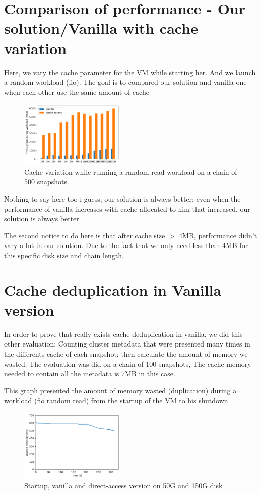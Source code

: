 \documentclass[sigplan,screen,10pt]{acmart}
\begin{document}
	\section*{Comparison of performance - Our solution/Vanilla with cache variation}
	
	Here, we vary the cache parameter for the VM while starting her. And we launch a random workload (fio).
	The goal is to compared our solution and vanilla one when each other use the same amount of cache 
	
	\begin{figure}[h]
		\center
		\includegraphics[width=0.45\textwidth]{cache_variation.pdf}
		\caption{Cache variation while running a random read workload on a chain of 500 snapshots}
		\label{fig:fig-c}
	\end{figure}

	Nothing to say here too i guess, our solution is always better; even when the performance of vanilla increases with cache allocated to him that increased, our solution is always better.
	
	The second notice to do here is that after cache size $>$ 4MB, performance didn't vary a lot in our solution. Due to the fact that we only need less than 4MB for this specific disk size and chain length.
	
	\section*{Cache deduplication in Vanilla version}
	
	In order to prove that really exists cache deduplication in vanilla, we did this other evaluation: Counting cluster metadata that were presented many times in the differents cache of each snapshot; then calculate the amount of memory we wasted. The evaluation was did on a chain of 100 snapshots, The cache memory needed to contain all the metadata is 7MB in this case.
	
	This graph presented the amount of memory wasted (duplication) during a workload (fio random read) from the startup of the VM to his shutdown.
	
	\begin{figure}[h]
		\center
		\includegraphics[width=0.45\textwidth]{dupli_memory.pdf}
		\caption{Startup, vanilla and direct-access version on 50G and 150G disk}
		\label{fig:fig-d}
	\end{figure}
\end{document}
